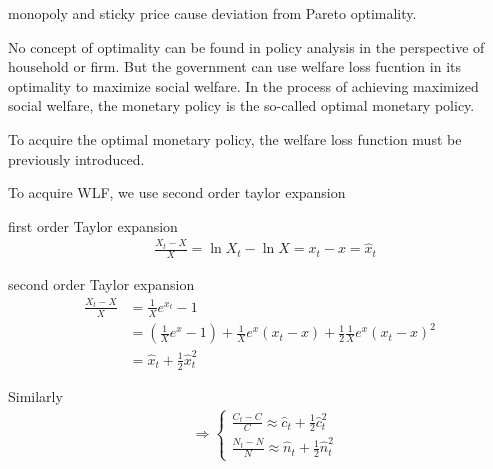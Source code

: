 \begin{blueblock}
\begin{note}
\end{note}
monopoly and sticky price cause deviation from Pareto optimality.
\end{blueblock}



\begin{blueblock}
\begin{note}
\end{note}
No concept of optimality can be found in policy analysis in the perspective of household or firm. But the government can use welfare loss fucntion in its optimality to maximize social welfare. In the process of achieving maximized social welfare, the monetary policy is the so-called optimal monetary policy.

\end{blueblock}

To acquire the optimal monetary policy, the welfare loss function must be previously introduced.


To acquire WLF, we use second order taylor expansion

first order Taylor expansion
\begin{align}
& \frac{X_t -X}{X}=\ln X_t -\ln X=x_t -x =\hat x_t
\end{align}

second order Taylor expansion
\begin{equation}
\begin{split}
 \frac{X_t -X}{X}&=\frac{1}{X}e^{x_t}-1
\\& = (\frac{1}{X}e^x -1)+\frac{1}{X}e^x(x_t -x)+\frac{1}{2}\frac{1}{X}e^x (x_t-x)^2
\\& = \hat x_t +\frac{1}{2}\hat x_t^2
\end{split}
\end{equation}

Similarly
\begin{align}
& \Rightarrow
\begin{cases}
\frac{C_t -C}{C}\approx \hat c_t +\frac{1}{2} \hat c_t^2
\\\frac{N_t -N}{N}\approx \hat n_t +\frac{1}{2} \hat n_t^2
\end{cases}
\end{align}

